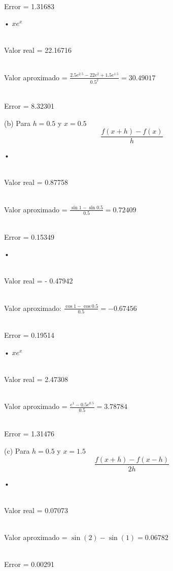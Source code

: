 \documentclass[11pt]{article}
\begin{document}
\\ Error = 1.31683

• $xe^x$

\\Valor real = 22.16716  

\\ Valor aproximado = $\frac{{2.5}e^{2.5} - 2{2}e^{2} + {1.5}e^{1.5}}{0.5^2} = 30.49017 $

\\ Error = 8.32301


\vspace{0.5cm}
(b) Para $h = 0.5$ y $x=0.5$
\begin{equation}
 \frac{f(x + h) - f(x)}{h}
\end{equation}

• 

\\Valor real =  0.87758  

\\ Valor aproximado = $\frac{\sin{1} - \sin{0.5}}{0.5} = 0.72409$

\\ Error = 0.15349

• 

\\Valor real = - 0.47942

\\ Valor aproximado: $\frac{\cos{1} - \cos{0.5}}{0.5} = -0.67456$

\\ Error = 0.19514

• $xe^x$

\\Valor real = 2.47308  

\\ Valor aproximado = $\frac{e^1-0.5e^0.5}{0.5}= 3.78784 $

\\ Error = 1.31476

\vspace{0.5cm}
(c) Para $h = 0.5$ y $x=1.5$
\begin{equation}
 \frac{f(x + h) − f(x - h)}{2h}
\end{equation}

• 

\\Valor real =  0.07073  

\\ Valor aproximado =  $\sin(2) − \sin(1) = 0.06782$

\\ Error = 0.00291
\end{document}
